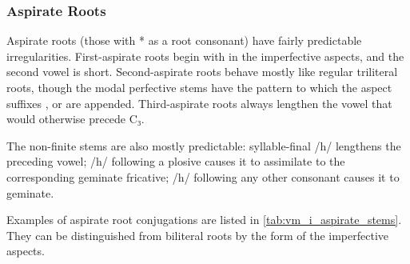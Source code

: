 \documentclass[grammar]{subfiles}
\begin{document}
\subsubsection{Aspirate Roots}
\label{sssec:vm_i_aspirate}

Aspirate roots (those with * as a root consonant) have fairly predictable
irregularities.  First-aspirate roots begin with  in the imperfective
aspects, and the second vowel is short.  Second-aspirate roots behave mostly like
regular triliteral roots, though the modal perfective stems have the pattern
 to which the aspect suffixes ,  or  are appended.
Third-aspirate roots always lengthen the vowel that would otherwise precede C₃.  

The non-finite stems are also mostly predictable: syllable-final /h/ lengthens the
preceding vowel; /h/ following a plosive causes it to assimilate to the
corresponding geminate fricative; /h/ following any other consonant causes it
to geminate. 

Examples of aspirate root conjugations are listed in
\cref{tab:vm_i_aspirate_stems}.  They can be distinguished from biliteral roots
by the form of the imperfective aspects. 
\end{document}
